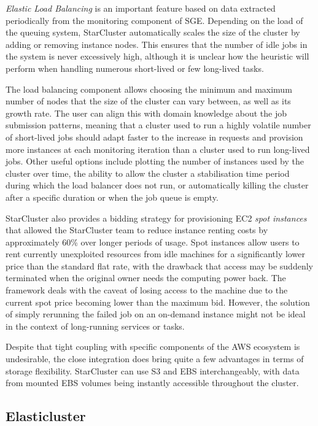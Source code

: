 \textit{Elastic Load Balancing} is an important feature based on data extracted periodically from the monitoring component of SGE. Depending on the load of the queuing system, StarCluster automatically scales the size of the cluster by adding or removing instance nodes. This ensures that the number of idle jobs in the system is never excessively high, although it is unclear how the heuristic will perform when handling numerous short-lived or few long-lived tasks. 

The load balancing component allows choosing the minimum and maximum number of nodes that the size of the cluster can vary between, as well as its growth rate. The user can align this with domain knowledge about the job submission patterns, meaning that a cluster used to run a highly volatile number of short-lived jobs should adapt faster to the increase in requests and provision more instances at each monitoring iteration than a cluster used to run long-lived jobs. Other useful options include plotting the number of instances used by the cluster over time, the ability to allow the cluster a stabilisation time period during which the load balancer does not run, or automatically killing the cluster after a specific duration or when the job queue is empty.

StarCluster also provides a bidding strategy for provisioning EC2 \textit{spot instances} that allowed the StarCluster team to reduce instance renting costs by approximately 60\% over longer periods of usage. Spot instances allow users to rent currently unexploited resources from idle machines for a significantly lower price than the standard flat rate, with the drawback that access may be suddenly terminated when the original owner needs the computing power back. The framework deals with the caveat of losing access to the machine due to the current spot price becoming lower than the maximum bid. However, the solution of simply rerunning the failed job on an on-demand instance might not be ideal in the context of long-running services or tasks.

Despite that tight coupling with specific components of the AWS ecosystem is undesirable, the close integration does bring quite a few advantages in terms of storage flexibility. StarCluster can use S3 and EBS interchangeably, with data from mounted EBS volumes being instantly accessible throughout the cluster.

\subsection{Elasticluster}

